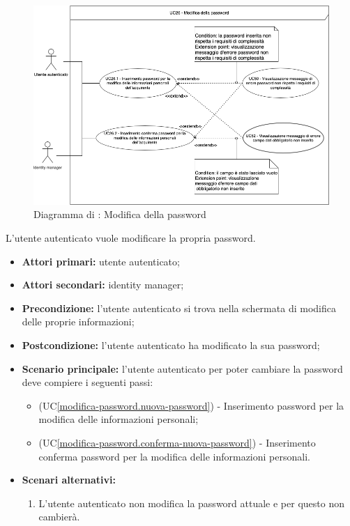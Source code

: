 \label{modifica-password}

\begin{figure}[H]
    \centering
    \includegraphics[scale=0.5]{Immagini/DiagrammiUC/UtenteAutenticato/ModificaPassword.png}
    \caption{Diagramma di \actualUC: Modifica della password}
    \label{fig:modifica-password}
\end{figure}

L'utente autenticato vuole modificare la propria password.

\begin{itemize}
    \item \textbf{Attori primari:} utente autenticato;
    \item \textbf{Attori secondari:} identity manager;
    \item \textbf{Precondizione:} l'utente autenticato si trova nella schermata di modifica delle proprie informazioni;
    \item \textbf{Postcondizione:} l'utente autenticato ha modificato la sua password;
    \item \textbf{Scenario principale:} l'utente autenticato per poter cambiare la password deve compiere i seguenti passi:
    \begin{itemize}
        \item (UC\ref{modifica-password.nuova-password}) - Inserimento password per la modifica delle informazioni personali;
        \item (UC\ref{modifica-password.conferma-nuova-password}) - Inserimento conferma password per la modifica delle informazioni personali.
    \end{itemize}
    \item \textbf{Scenari alternativi:}
    \begin{enumerate}[label=\lett]
        \item L'utente autenticato non modifica la password attuale e per questo non cambierà. 
    \end{enumerate}
\end{itemize}


